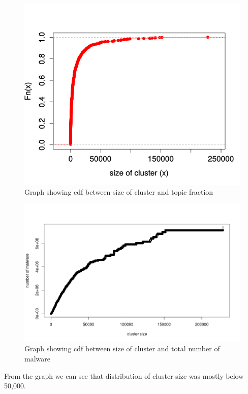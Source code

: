 \begin{figure}[htbp]
\begin{center}
  \includegraphics[scale=0.5]{figures/ecdfclustersize.png}
\end{center}
\caption{Graph showing cdf between size of cluster and topic fraction}
\label{fig:ecdfclustersize}
\end{figure}
\begin{figure}[htbp]
\begin{center}
  \includegraphics[scale=0.3]{figures/cdfclusterlen2.png}
\end{center}
\caption{Graph showing cdf between size of cluster and total number of malware}
\label{fig:cdfclusterlen}
\end{figure}
From the graph we can see that distribution of cluster size was mostly below 50,000.
